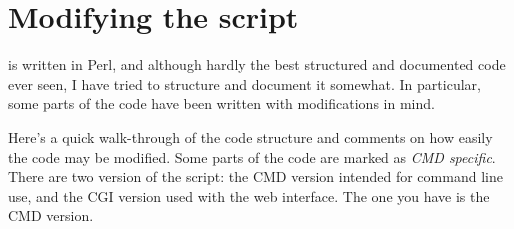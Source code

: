 \documentclass{article}
\begin{document}
\section{Modifying the \TeXcount{} script}\label{sec:code}

\TeXcount{} is written in Perl, and although hardly the best structured and documented code ever seen, I have tried to structure and document it somewhat. In particular, some parts of the code have been written with modifications in mind.

Here's a quick walk-through of the code structure and comments on how easily the code may be modified. Some parts of the code are marked as \emph{CMD specific}. There are two version of the script: the CMD version intended for command line use, and the CGI version used with the web interface. The one you have is the CMD version.
\end{document}
